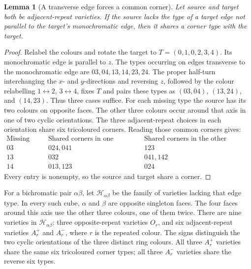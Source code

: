 \documentclass[11pt]{article}
\newtheorem{lemma}[theorem]{Lemma}
\theoremstyle{remark}
\begin{document}
\begin{lemma}[A transverse edge forces a common corner]\label{lem:transverse-corner}
Let source and target both be adjacent-repeat varieties. If the source
lacks the type of a target edge not parallel to the target's monochromatic
edge, then it shares a corner type with the target.
\end{lemma}
\begin{proof}
Relabel the colours and rotate the target to $T=(0,1,0,2,3,4)$.
Its monochromatic edge is parallel to $z$.
The types occurring on edges transverse to the monochromatic edge are
$03,04,13,14,23,24$.  The proper half-turn interchanging the $x$- and
$y$-directions and reversing $z$, followed by the colour relabelling
$1\leftrightarrow2$, $3\leftrightarrow4$, fixes $T$ and pairs these types
as $(03,04)$, $(13,24)$, and $(14,23)$.  Thus three cases suffice.
For each missing type the source has its two colours on opposite faces.
The other three colours occur around that axis in one of two cyclic
orientations.  The three adjacent-repeat choices in each orientation
share six tricoloured corners.  Reading those common corners gives:
\[
\begin{array}{c|c|c}
\text{Missing type}&\text{Shared corners in one orientation}
 &\text{Shared corners in the other orientation}\\\hline
03&024,041&123\\
13&032&041,142\\
14&013,123&024
\end{array}
\]
Every entry is nonempty, so the source and target share a corner.
\end{proof}

For a bichromatic pair $\alpha\beta$, let $\mathcal H_{\alpha\beta}$ be the family of
varieties lacking that edge type.  In every such cube, $\alpha$ and $\beta$ are
opposite singleton faces.  The four faces around this axis use the other
three colours, one of them twice.  There are nine varieties in
$\mathcal H_{\alpha\beta}$: three opposite-repeat varieties $O_r$, and six
adjacent-repeat varieties $A_r^+$ and $A_r^-$, where $r$ is the repeated
colour.  The signs distinguish the two cyclic orientations of the three
distinct ring colours.  All three $A_r^+$ varieties share the same six
tricoloured corner types; all three $A_r^-$ varieties share the reverse
six types.
\end{document}

